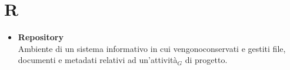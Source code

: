 \chapter{R} \label{R}
	\begin{itemize}
		\item \textbf{Repository} \\
		Ambiente di un sistema informativo in cui vengonoconservati e gestiti file, documenti e metadati relativi ad un’attività$_G$ di progetto.
	\end{itemize}